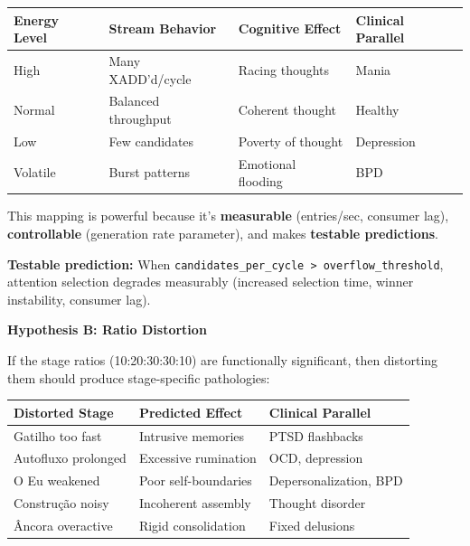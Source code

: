 \documentclass[
  11pt,
]{article}
\newcounter{none} %
\begin{document}
{\def\LTcaptype{none} %
\begin{longtable}[]{@{}
  >{\raggedright\arraybackslash}p{}
  >{\raggedright\arraybackslash}p{}
  >{\raggedright\arraybackslash}p{}
  >{\raggedright\arraybackslash}p{}@{}}
\toprule\noalign{}
\begin{minipage}[b]{\linewidth}\raggedright
Energy Level
\end{minipage} & \begin{minipage}[b]{\linewidth}\raggedright
Stream Behavior
\end{minipage} & \begin{minipage}[b]{\linewidth}\raggedright
Cognitive Effect
\end{minipage} & \begin{minipage}[b]{\linewidth}\raggedright
Clinical Parallel
\end{minipage} \\
\midrule\noalign{}
\endhead
\bottomrule\noalign{}
\endlastfoot
High & Many XADD'd/cycle & Racing thoughts & Mania \\
Normal & Balanced throughput & Coherent thought & Healthy \\
Low & Few candidates & Poverty of thought & Depression \\
Volatile & Burst patterns & Emotional flooding & BPD \\
\end{longtable}
}

This mapping is powerful because it's \textbf{measurable} (entries/sec,
consumer lag), \textbf{controllable} (generation rate parameter), and
makes \textbf{testable predictions}.

\textbf{Testable prediction:} When
\texttt{candidates\_per\_cycle\ \textgreater{}\ overflow\_threshold},
attention selection degrades measurably (increased selection time,
winner instability, consumer lag).

\textbf{Hypothesis B: Ratio Distortion}

If the stage ratios (10:20:30:30:10) are functionally significant, then
distorting them should produce stage-specific pathologies:

{\def\LTcaptype{none} %
\begin{longtable}[]{@{}lll@{}}
\toprule\noalign{}
Distorted Stage & Predicted Effect & Clinical Parallel \\
\midrule\noalign{}
\endhead
\bottomrule\noalign{}
\endlastfoot
Gatilho too fast & Intrusive memories & PTSD flashbacks \\
Autofluxo prolonged & Excessive rumination & OCD, depression \\
O Eu weakened & Poor self-boundaries & Depersonalization, BPD \\
Construção noisy & Incoherent assembly & Thought disorder \\
Âncora overactive & Rigid consolidation & Fixed delusions \\
\end{longtable}
}
\end{document}
